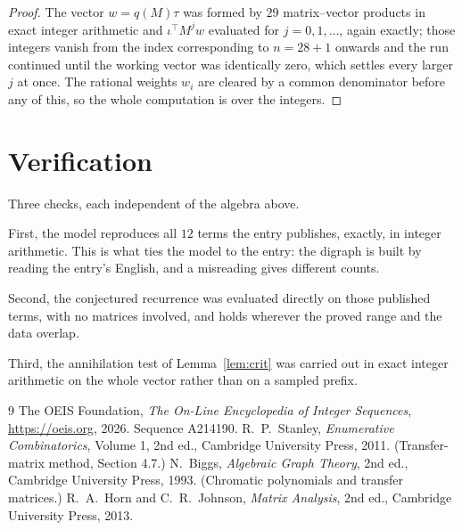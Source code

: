\documentclass[11pt,a4paper]{article}
\theoremstyle{plain}
\theoremstyle{definition}
\begin{document}
\begin{proof}
The vector $w=q(M)\tau$ was formed by $29$ matrix--vector products in exact integer
arithmetic and $\iota^{\!\top}M^{j}w$ evaluated for $j=0,1,\dots$, again exactly; those
integers vanish from the index corresponding to $n=28+1$ onwards and the run continued
until the working vector was identically zero, which settles every larger $j$ at once. The
rational weights $w_i$ are cleared by a common denominator before any of this, so the whole
computation is over the integers.
\end{proof}

\section{Verification}

Three checks, each independent of the algebra above.

First, the model reproduces all $12$ terms the entry publishes, exactly, in integer
arithmetic. This is what ties the model to the entry: the digraph is built by reading the
entry's English, and a misreading gives different counts.

Second, the conjectured recurrence was evaluated directly on those published terms, with no
matrices involved, and holds wherever the proved range and the data overlap.

Third, the annihilation test of Lemma~\ref{lem:crit} was carried out in exact integer
arithmetic on the whole vector rather than on a sampled prefix.

\begin{thebibliography}{9}
 The OEIS Foundation, \emph{The On-Line Encyclopedia of Integer
Sequences}, \url{https://oeis.org}, 2026. Sequence A214190.
 R.~P.~Stanley, \emph{Enumerative Combinatorics}, Volume 1, 2nd ed.,
Cambridge University Press, 2011. (Transfer-matrix method, Section 4.7.)
 N.~Biggs, \emph{Algebraic Graph Theory}, 2nd ed., Cambridge University
Press, 1993. (Chromatic polynomials and transfer matrices.)
 R.~A.~Horn and C.~R.~Johnson, \emph{Matrix Analysis}, 2nd ed., Cambridge
University Press, 2013.
\end{thebibliography}
\end{document}
